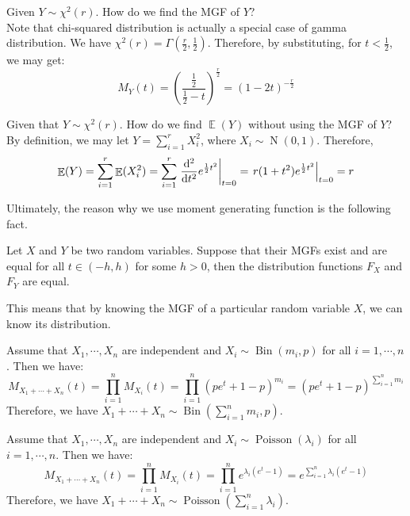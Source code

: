\documentclass{huhtakm-template-book-v2}
\DeclareMathOperator{\E}{\mathbb{E}}
\DeclareMathOperator{\Bin}{Bin}
\DeclareMathOperator{\Poisson}{Poisson}
\DeclareMathOperator{\N}{N}
\begin{document}
\newpage
\begin{eg}
	Given $Y\sim\chi^{2}(r)$. How do we find the MGF of $Y$?\\
	Note that chi-squared distribution is actually a special case of gamma distribution. We have $\chi^{2}(r)=\Gamma(\frac{r}{2},\frac{1}{2})$. Therefore, by substituting, for $t<\frac{1}{2}$, we may get:
	\begin{equation*}
		M_{Y}(t)=\left(\frac{\frac{1}{2}}{\frac{1}{2}-t}\right)^{\frac{r}{2}}=(1-2t)^{-\frac{r}{2}}
	\end{equation*}
\end{eg}
\begin{eg}
	Given that $Y\sim\chi^{2}(r)$. How do we find $\E(Y)$ without using the MGF of $Y$?\\
	By definition, we may let $Y=\sum_{i=1}^{r}X_{i}^{2}$, where $X_{i}\sim\N(0,1)$. Therefore,
	\begin{equation*}
		\E(Y)=\sum_{i=1}^{r}\E(X_{i}^{2})=\sum_{i=1}^{r}\left.\odv*[order={2}]{}{t}e^{\frac{1}{2}t^{2}}\right|_{t=0}=\left.r(1+t^{2})e^{\frac{1}{2}t^{2}}\right|_{t=0}=r
	\end{equation*}
\end{eg}
Ultimately, the reason why we use moment generating function is the following fact.
\begin{thm}
	Let $X$ and $Y$ be two random variables. Suppose that their MGFs exist and are equal for all $t\in(-h,h)$ for some $h>0$, then the distribution functions $F_{X}$ and $F_{Y}$ are equal.
\end{thm}
This means that by knowing the MGF of a particular random variable $X$, we can know its distribution.
\begin{eg}
	Assume that $X_{1},\cdots,X_{n}$ are independent and $X_{i}\sim\Bin(m_{i},p)$ for all $i=1,\cdots,n$. Then we have:
	\begin{equation*}
		M_{X_{1}+\cdots+X_{n}}(t)=\prod_{i=1}^{n}M_{X_{i}}(t)=\prod_{i=1}^{n}(pe^{t}+1-p)^{m_{i}}=(pe^{t}+1-p)^{\sum_{i=1}^{n}m_{i}}
	\end{equation*}
	Therefore, we have $X_{1}+\cdots+X_{n}\sim\Bin(\sum_{i=1}^{n}m_{i},p)$.
\end{eg}
\begin{eg}
	Assume that $X_{1},\cdots,X_{n}$ are independent and $X_{i}\sim\Poisson(\lambda_{i})$ for all $i=1,\cdots,n$. Then we have:
	\begin{equation*}
		M_{X_{1}+\cdots+X_{n}}(t)=\prod_{i=1}^{n}M_{X_{i}}(t)=\prod_{i=1}^{n}e^{\lambda_{i}(e^{t}-1)}=e^{\sum_{i=1}^{n}\lambda_{i}(e^{t}-1)}
	\end{equation*}
	Therefore, we have $X_{1}+\cdots+X_{n}\sim\Poisson(\sum_{i=1}^{n}\lambda_{i})$.
\end{eg}
\end{document}
